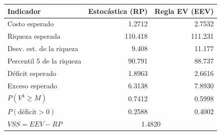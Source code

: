 {\small
\begin{tabular}{lrr}
\toprule
Indicador & Estocástica (RP) & Regla EV (EEV) \\
\midrule
Costo esperado & 1.2712 & 2.7532 \\
Riqueza esperada & 110.418 & 111.231 \\
Desv. est. de la riqueza & 9.408 & 11.177 \\
Percentil 5 de la riqueza & 90.791 & 88.737 \\
Déficit esperado & 1.8963 & 2.6616 \\
Exceso esperado & 6.3138 & 7.8930 \\
$P(V^4\ge M)$ & 0.7412 & 0.5998 \\
$P(\text{déficit}>0)$ & 0.2588 & 0.4002 \\
$VSS=EEV-RP$ & \multicolumn{2}{c}{1.4820} \\
\bottomrule
\end{tabular}
}
